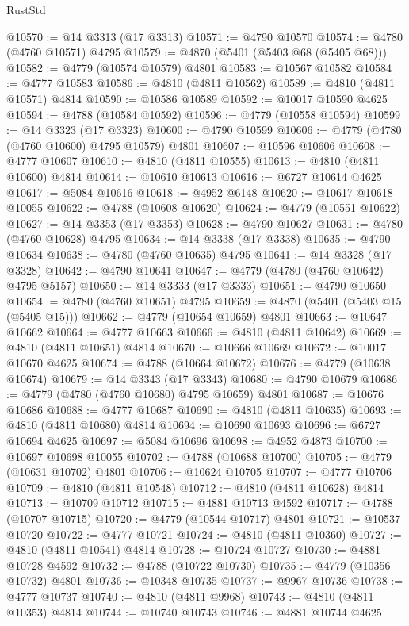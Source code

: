 \begin{lexlean}{RustStd}
\begin{coremodule}
@10570 := @14 @3313 (@17 @3313)
@10571 := @4790 @10570
@10574 := @4780 (@4760 @10571) @4795
@10579 := @4870 (@5401 (@5403 @68 (@5405 @68)))
@10582 := @4779 (@10574 @10579) @4801
@10583 := @10567 @10582
@10584 := @4777 @10583
@10586 := @4810 (@4811 @10562)
@10589 := @4810 (@4811 @10571) @4814
@10590 := @10586 @10589
@10592 := @10017 @10590 @4625
@10594 := @4788 (@10584 @10592)
@10596 := @4779 (@10558 @10594)
@10599 := @14 @3323 (@17 @3323)
@10600 := @4790 @10599
@10606 := @4779 (@4780 (@4760 @10600) @4795 @10579) @4801
@10607 := @10596 @10606
@10608 := @4777 @10607
@10610 := @4810 (@4811 @10555)
@10613 := @4810 (@4811 @10600) @4814
@10614 := @10610 @10613
@10616 := @6727 @10614 @4625
@10617 := @5084 @10616
@10618 := @4952 @6148
@10620 := @10617 @10618 @10055
@10622 := @4788 (@10608 @10620)
@10624 := @4779 (@10551 @10622)
@10627 := @14 @3353 (@17 @3353)
@10628 := @4790 @10627
@10631 := @4780 (@4760 @10628) @4795
@10634 := @14 @3338 (@17 @3338)
@10635 := @4790 @10634
@10638 := @4780 (@4760 @10635) @4795
@10641 := @14 @3328 (@17 @3328)
@10642 := @4790 @10641
@10647 := @4779 (@4780 (@4760 @10642) @4795 @5157)
@10650 := @14 @3333 (@17 @3333)
@10651 := @4790 @10650
@10654 := @4780 (@4760 @10651) @4795
@10659 := @4870 (@5401 (@5403 @15 (@5405 @15)))
@10662 := @4779 (@10654 @10659) @4801
@10663 := @10647 @10662
@10664 := @4777 @10663
@10666 := @4810 (@4811 @10642)
@10669 := @4810 (@4811 @10651) @4814
@10670 := @10666 @10669
@10672 := @10017 @10670 @4625
@10674 := @4788 (@10664 @10672)
@10676 := @4779 (@10638 @10674)
@10679 := @14 @3343 (@17 @3343)
@10680 := @4790 @10679
@10686 := @4779 (@4780 (@4760 @10680) @4795 @10659) @4801
@10687 := @10676 @10686
@10688 := @4777 @10687
@10690 := @4810 (@4811 @10635)
@10693 := @4810 (@4811 @10680) @4814
@10694 := @10690 @10693
@10696 := @6727 @10694 @4625
@10697 := @5084 @10696
@10698 := @4952 @4873
@10700 := @10697 @10698 @10055
@10702 := @4788 (@10688 @10700)
@10705 := @4779 (@10631 @10702) @4801
@10706 := @10624 @10705
@10707 := @4777 @10706
@10709 := @4810 (@4811 @10548)
@10712 := @4810 (@4811 @10628) @4814
@10713 := @10709 @10712
@10715 := @4881 @10713 @4592
@10717 := @4788 (@10707 @10715)
@10720 := @4779 (@10544 @10717) @4801
@10721 := @10537 @10720
@10722 := @4777 @10721
@10724 := @4810 (@4811 @10360)
@10727 := @4810 (@4811 @10541) @4814
@10728 := @10724 @10727
@10730 := @4881 @10728 @4592
@10732 := @4788 (@10722 @10730)
@10735 := @4779 (@10356 @10732) @4801
@10736 := @10348 @10735
@10737 := @9967 @10736
@10738 := @4777 @10737
@10740 := @4810 (@4811 @9968)
@10743 := @4810 (@4811 @10353) @4814
@10744 := @10740 @10743
@10746 := @4881 @10744 @4625

\end{coremodule}
\end{lexlean}
